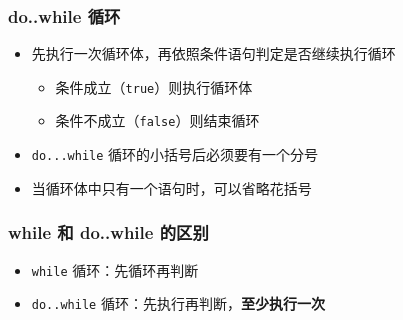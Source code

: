 \begin{frame}[fragile]
    \frametitle{do..while 循环}

    \begin{overlayarea}{\textwidth}{.7\textheight}
        \begin{itemize}

                

            \item<1-> 先执行一次循环体，再依照条件语句判定是否继续执行循环

                \begin{itemize}
                    \item<2-> 条件成立（\lstinline|true|）则执行循环体
                    \item<2-> 条件不成立（\lstinline|false|）则结束循环
                \end{itemize}

            \item<3-> \lstinline|do...while| 循环的小括号后必须要有一个分号

            \item<4-> 当循环体中只有一个语句时，可以省略花括号
        \end{itemize}
    \end{overlayarea}
\end{frame}

\begin{frame}[fragile]
    \frametitle{while 和 do..while 的区别}

    \begin{itemize}
        \item \lstinline|while| 循环：先循环再判断
        \item \lstinline|do..while| 循环：先执行再判断，\textbf{至少执行一次}
    \end{itemize}

\end{frame}


